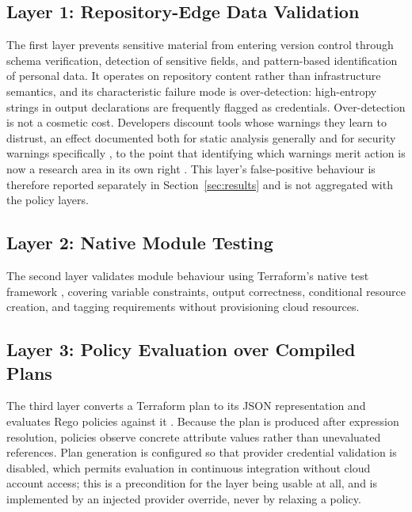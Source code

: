 \documentclass[smallextended]{svjour3}
\begin{document}
\subsection{Layer 1: Repository-Edge Data Validation}
The first layer prevents sensitive material from entering version control through
schema verification, detection of sensitive fields, and pattern-based
identification of personal data. It operates on repository content rather than
infrastructure semantics, and its characteristic failure mode is over-detection:
high-entropy strings in output declarations are frequently flagged as
credentials. Over-detection is not a cosmetic cost. Developers discount tools
whose warnings they learn to distrust, an effect documented both for static
analysis generally \citep{vassallo2019engage} and for security warnings
specifically \citep{tahaei2021notifications}, to the point that identifying which
warnings merit action is now a research area in its own right
\citep{ge2023actionable}. This layer's false-positive behaviour is therefore
reported separately in Section~\ref{sec:results} and is not aggregated with the
policy layers.

\subsection{Layer 2: Native Module Testing}
The second layer validates module behaviour using Terraform's native test
framework \citep{hashicorp2024tests}, covering variable constraints, output
correctness, conditional resource creation, and tagging requirements without
provisioning cloud resources.

\subsection{Layer 3: Policy Evaluation over Compiled Plans}
The third layer converts a Terraform plan to its JSON representation and
evaluates Rego policies against it \citep{openpolicyagent2024}. Because the plan
is produced after expression resolution, policies observe concrete attribute
values rather than unevaluated references. Plan generation is configured so that
provider credential validation is disabled, which permits evaluation in
continuous integration without cloud account access; this is a precondition for
the layer being usable at all, and is implemented by an injected provider
override, never by relaxing a policy.
\end{document}
